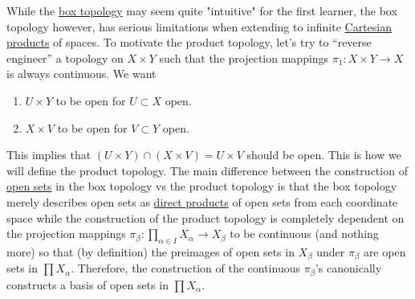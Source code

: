   While the \hyperref[def:box-topology]{box topology} may seem quite "intuitive" for the first learner, the box topology however, has serious limitations when extending to infinite \hyperref[st-def:cart-prod-2]{Cartesian products} of spaces. To motivate the product topology, let's try to ``reverse engineer'' a topology on $X \times Y$ such that the projection mappings $\pi_1: X \times Y \rightarrow X$ is always continuous. We want 
  \begin{enumerate}
    \item $U \times Y$ to be open for $U \subset X$ open. 
    \item $X \times V$ to be open for $V \subset Y$ open. 
  \end{enumerate}
  This implies that $(U \times Y) \cap (X \times V) = U \times V$ should be open. This is how we will define the product topology. The main difference between the construction of \hyperref[def:open-set]{open sets} in the box topology vs the product topology is that the box topology merely describes open sets as \hyperref[alg-def:direct-product]{direct products} of open sets from each coordinate space while the construction of the product topology is completely dependent on the projection mappings $\pi_\beta: \prod_{\alpha \in I} X_\alpha \rightarrow X_\beta$ to be continuous (and nothing more) so that (by definition) the preimages of open sets in $X_\beta$ under $\pi_\beta$ are open sets in $\prod X_\alpha$. Therefore, the construction of the continuous $\pi_\beta$'s canonically constructs a basis of open sets in $\prod X_\alpha$. 

